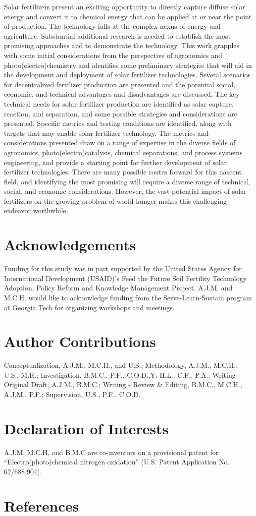 Solar fertilizers present an exciting opportunity to directly capture diffuse solar energy and convert it to chemical energy that can be applied at or near the point of production. The technology falls at the complex nexus of energy and agriculture. Substantial additional research is needed to establish the most promising approaches and to demonstrate the technology. This work grapples with some initial considerations from the perspective of agronomics and photo(electro)chemistry and identifies some preliminary strategies that will aid in the development and deployment of solar fertilizer technologies. Several scenarios for decentralized fertilizer production are presented and the potential social, economic, and technical advantages and disadvantages are discussed. The key technical needs for solar fertilizer production are identified as solar capture, reaction, and separation, and some possible strategies and considerations are presented. Specific metrics and testing conditions are identified, along with targets that may enable solar fertilizer technology. The metrics and considerations presented draw on a range of expertise in the diverse fields of agronomics, photo(electro)catalysis, chemical separations, and process systems engineering, and provide a starting point for further development of solar fertilizer technologies. There are many possible routes forward for this nascent field, and identifying the most promising will require a diverse range of technical, social, and economic considerations. However, the vast potential impact of solar fertilizers on the growing problem of world hunger makes this challenging endeavor worthwhile.

\section*{Acknowledgements}
Funding for this study was in part supported by the United States Agency for International Development (USAID)’s Feed the Future Soil Fertility Technology Adoption, Policy Reform and Knowledge Management Project. A.J.M. and M.C.H. would like to acknowledge funding from the Serve-Learn-Sustain program at Georgia Tech for organizing workshops and meetings.

\section*{Author Contributions}
Conceptualization, A.J.M., M.C.H., and U.S.; Methodology, A.J.M., M.C.H., U.S., M.R.; Investigation, B.M.C., P.F., C.O.D.,Y.-H.L., C.F., P.A.; Writing - Original Draft, A.J.M., B.M.C.; Writing - Review \& Editing, B.M.C., M.C.H., A.J.M., P.F.; Supervision, U.S., P.F., C.O.D. 

\section*{Declaration of Interests}
A.J.M, M.C.H, and B.M.C are co-inventors on a provisional patent for ``Electro(photo)chemical nitrogen oxidation'' (U.S. Patent Application No. 62/688,904).

\section*{References}
